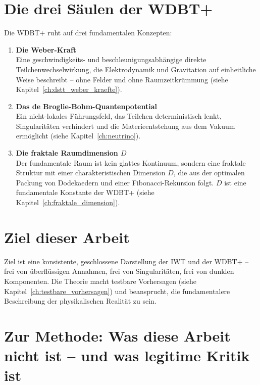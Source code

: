 \section{Die drei Säulen der WDBT+}
\label{sec:drei_saeulen}

Die WDBT+ ruht auf drei fundamentalen Konzepten:

\begin{enumerate}
    \item \textbf{Die Weber-Kraft} \\
    Eine geschwindigkeits- und beschleunigungsabhängige direkte Teilchenwechselwirkung, die Elektrodynamik und Gravitation auf einheitliche Weise beschreibt – ohne Felder und ohne Raumzeitkrümmung (siehe Kapitel~\ref{ch:dstt_weber_kraefte}).
    
    \item \textbf{Das de Broglie-Bohm-Quantenpotential} \\
    Ein nicht-lokales Führungsfeld, das Teilchen deterministisch lenkt, Singularitäten verhindert und die Materieentstehung aus dem Vakuum ermöglicht (siehe Kapitel~\ref{ch:neutrino}).
    
    \item \textbf{Die fraktale Raumdimension \( D \)} \\
    Der fundamentale Raum ist kein glattes Kontinuum, sondern eine fraktale Struktur mit einer charakteristischen Dimension \( D \), die aus der optimalen Packung von Dodekaedern und einer Fibonacci-Rekursion folgt. \( D \) ist eine fundamentale Konstante der WDBT+ (siehe Kapitel~\ref{ch:fraktale_dimension}).
\end{enumerate}

\section{Ziel dieser Arbeit}
\label{sec:ziel}

Ziel ist eine konsistente, geschlossene Darstellung der IWT und der WDBT+ – frei von überflüssigen Annahmen, frei von Singularitäten, frei von dunklen Komponenten. Die Theorie macht testbare Vorhersagen (siehe Kapitel~\ref{ch:testbare_vorhersagen}) und beansprucht, die fundamentalere Beschreibung der physikalischen Realität zu sein.

\section{Zur Methode: Was diese Arbeit nicht ist – und was legitime Kritik ist}
\label{sec:methode}

